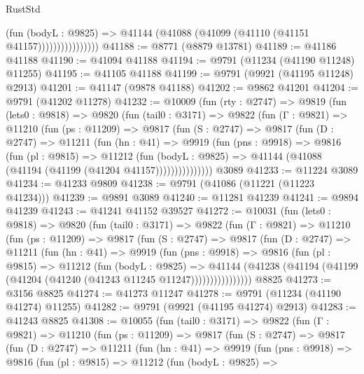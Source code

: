 \begin{lexlean}{RustStd}
\begin{coremodule}
                          (fun (bodyL : @9825) =>
                          @41144 (@41088 (@41099 (@41110 (@41151 @41157))))))))))))))))
@41188 := @8771 (@8879 @13781)
@41189 := @41186 @41188
@41190 := @41094 @41188
@41194 := @9791 (@11234 (@41190 @11248) @11255)
@41195 := @41105 @41188
@41199 := @9791 (@9921 (@41195 @11248) @2913)
@41201 := @41147 (@9878 @41188)
@41202 := @9862 @41201
@41204 := @9791 (@41202 @11278)
@41232 := @10009
    (fun (rty : @2747) =>
    @9819
      (fun (lets0 : @9818) =>
      @9820
        (fun (tail0 : @3171) =>
        @9822
          (fun (Γ : @9821) =>
          @11210
            (fun (ps : @11209) =>
            @9817
              (fun (S : @2747) =>
              @9817
                (fun (D : @2747) =>
                @11211
                  (fun (hn : @41) =>
                  @9919
                    (fun (pns : @9918) =>
                    @9816
                      (fun (pl : @9815) =>
                      @11212
                        (fun (bodyL : @9825) =>
                        @41144 (@41088 (@41194 (@41199 (@41204 @41157)))))))))))))))
    @3089
@41233 := @11224 @3089
@41234 := @41233 @9809
@41238 := @9791 (@41086 (@11221 (@11223 @41234)))
@41239 := @9891 @3089
@41240 := @11281 @41239
@41241 := @9894 @41239
@41243 := @41241 @41152 @39527
@41272 := @10031
    (fun (lets0 : @9818) =>
    @9820
      (fun (tail0 : @3171) =>
      @9822
        (fun (Γ : @9821) =>
        @11210
          (fun (ps : @11209) =>
          @9817
            (fun (S : @2747) =>
            @9817
              (fun (D : @2747) =>
              @11211
                (fun (hn : @41) =>
                @9919
                  (fun (pns : @9918) =>
                  @9816
                    (fun (pl : @9815) =>
                    @11212
                      (fun (bodyL : @9825) =>
                      @41144
                        (@41238
                          (@41194 (@41199 (@41204 (@41240 (@41243 @11245 @11247))))))))))))))))
    @8825
@41273 := @3156 @8825
@41274 := @41273 @11247
@41278 := @9791 (@11234 (@41190 @41274) @11255)
@41282 := @9791 (@9921 (@41195 @41274) @2913)
@41283 := @41243 @8825
@41308 := @10055
    (fun (tail0 : @3171) =>
    @9822
      (fun (Γ : @9821) =>
      @11210
        (fun (ps : @11209) =>
        @9817
          (fun (S : @2747) =>
          @9817
            (fun (D : @2747) =>
            @11211
              (fun (hn : @41) =>
              @9919
                (fun (pns : @9918) =>
                @9816
                  (fun (pl : @9815) =>
                  @11212
                    (fun (bodyL : @9825) =>

\end{coremodule}
\end{lexlean}
